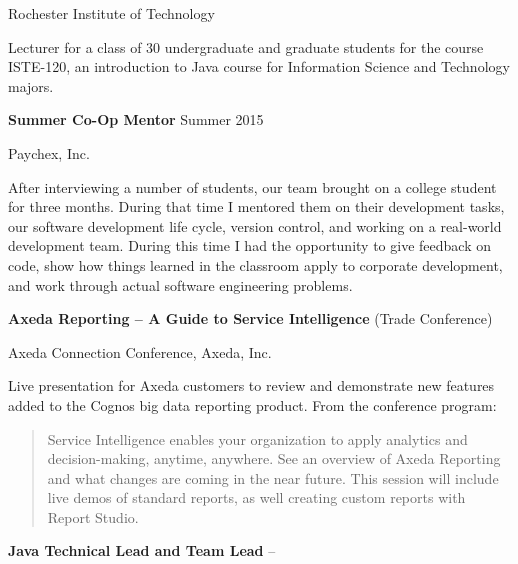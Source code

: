 \documentclass[MMMMyyyy,nonstopmode]{simpleresumecv_stacked}
\begin{document}
\begin{Body}
Rochester Institute of Technology
\begin{Detail}
\Item
Lecturer for a class of 30 undergraduate and graduate students for the course ISTE-120, an introduction to Java course for Information Science and Technology majors.
\end{Detail}

\BigGap
\Entry
\textbf{Summer Co-Op Mentor}
\hfill
Summer 2015

Paychex, Inc.
\begin{Detail}
\Item
After interviewing a number of students, our team brought on a college student for three months. During that time I mentored them on their development tasks, our software development life cycle, version control, and working on a real-world development team. During this time I had the opportunity to give feedback on code, show how things learned in the classroom apply to corporate development, and work through actual software engineering problems.
\end{Detail}
\fi      %

\BigGap
\Entry
\textbf{Axeda Reporting -- A Guide to Service Intelligence} (Trade Conference)
\hfill
{}

Axeda Connection Conference, Axeda, Inc.
\begin{Detail}
\Item
Live presentation for Axeda customers to review and demonstrate new features added to the Cognos big data reporting product.
\ifB
\Item
From the conference program:
\begin{quote}
Service Intelligence enables your organization to apply analytics and decision-making, anytime, anywhere. See an overview of Axeda Reporting and what changes are coming in the near future. This session will include live demos of standard reports, as well creating custom reports with Report Studio.
\end{quote}
\fi
\end{Detail}

\ifC      %
\BigGap
\Entry
\textbf{Java Technical Lead and Team Lead}
\hfill
{} -- 


\end{Body}
\end{document}
